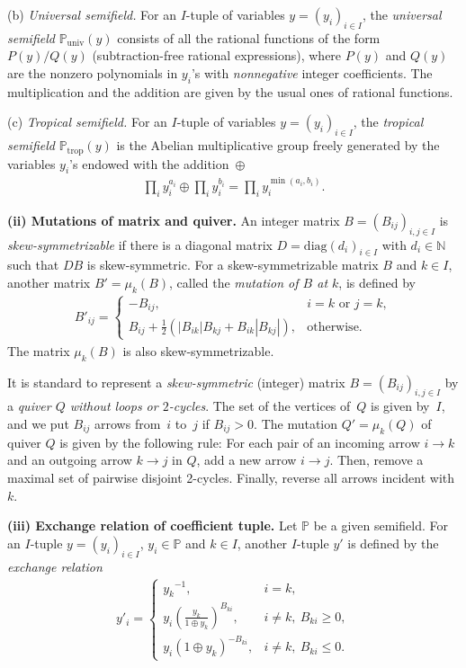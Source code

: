 \documentclass[11pt]{article}
\numberwithin{equation}{section}
\theoremstyle{definition}
\begin{document}
\par
(b) {\em Universal semifield.}
For an $I$-tuple of variables $y=(y_i)_{i\in I}$,
the {\em universal semifield\/}
$\mathbb{P}_{\mathrm{univ}}(y)$
consists of  all the rational functions
of the form
$P(y)/Q(y)$  (subtraction-free  rational expressions),
where $P(y)$ and $Q(y)$ are the nonzero polynomials
 in $y_i$'s with {\em nonnegative\/} integer coef\/f\/icients.
The multiplication and the addition
are given by the usual ones of rational functions.


(c) {\em Tropical semifield.}
For an $I$-tuple of variables $y=(y_i)_{i\in I}$,
the {\em tropical semifield\/}
$\mathbb{P}_{\mathrm{trop}}(y)$
is the Abelian multiplicative group freely generated by
the variables  $y_i$'s endowed with the addition~$\oplus$
\begin{gather}
\label{eq:trop}
\prod_i y_i^{a_i}\oplus
\prod_i y_i^{b_i}
=
\prod_i y_i^{\min(a_i,b_i)}.
\end{gather}



{\bf (ii)  Mutations of matrix and quiver.}
An integer matrix
$B=(B_{ij})_{i,j\in I}$  is {\em skew-sym\-met\-ri\-zab\-le\/}
if there is a diagonal matrix $D=\mathrm{diag}
(d_i)_{i\in I}$ with $d_i\in \mathbb{N}$
such that $DB$ is skew-symmetric.
For a skew-symmetrizable matrix $B$ and
$k\in I$, another matrix $B'=\mu_k(B)$,
called the {\em mutation of $B$ at $k$\/}, is def\/ined by
\begin{gather}
\label{eq:Bmut}
B'_{ij}=
\begin{cases}
-B_{ij},& \mbox{$i=k$ or $j=k$},\\
B_{ij}+\frac{1}{2}
(|B_{ik}|B_{kj} + B_{ik}|B_{kj}|),
&\mbox{otherwise}.
\end{cases}
\end{gather}
The matrix $\mu_k(B)$ is also skew-symmetrizable.

It is standard to represent
a {\em skew-symmetric} (integer) matrix $B=(B_{ij})_{i,j\in I}$
by a {\em quiver $Q$
without loops or $2$-cycles}.
The set of the vertices of~$Q$ is given by~$I$,
and we put $B_{ij}$ arrows from~$i$ to~$j$
if $B_{ij}>0$.
The mutation $Q'=\mu_k(Q)$ of quiver $Q$ is given by the following
rule:
For each pair of an incoming arrow $i\rightarrow k$
and an outgoing arrow $k\rightarrow j$ in $Q$,
add a new arrow $i\rightarrow j$.
Then, remove a maximal set of pairwise disjoint 2-cycles.
Finally, reverse all arrows incident with $k$.

{\bf (iii)  Exchange relation of coef\/f\/icient tuple.}
Let $\mathbb{P}$ be a given semif\/ield.
For an $I$-tuple $y=(y_i)_{i\in I}$, $y_i\in \mathbb{P}$
and $k\in I$, another $I$-tuple $y'$ is def\/ined
by the {\em exchange relation}
\begin{gather}
\label{eq:coef}
y'_i =
\begin{cases}
\displaystyle
{y_k}{}^{-1}, &i=k,\\
\displaystyle
y_i \left(\frac{y_k}{1\oplus {y_k}}\right)^{B_{ki}},&
i\neq k,\ B_{ki}\geq 0,\\
y_i (1\oplus y_k)^{-B_{ki}},&
i\neq k,\ B_{ki}\leq 0.
\end{cases}
\end{gather}
\end{document}
